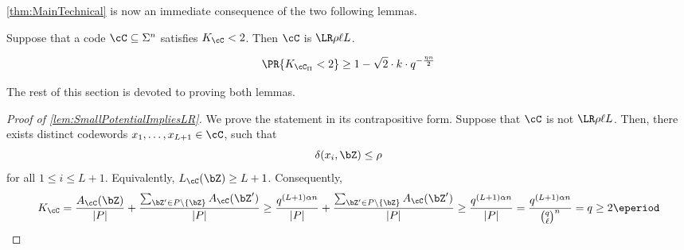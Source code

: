 \documentclass[11pt]{article}
\begin{document}
\cref{thm:MainTechnical} is now an immediate consequence of the two following lemmas.






\begin{lemma} \label{lem:SmallPotentialImpliesLR}
    Suppose that a code $\cC\subseteq \Sigma^n$ satisfies $K_\cC < 2$. Then $\cC$ is $\LR \rho \ell L$.
\end{lemma}

\begin{lemma} \label{lem:smallPotentialLikely}
    $$\PR{K_{\cC_\Pi} < 2} \ge 1-\sqrt2\cdot k \cdot q^{-\frac{\eta n} 2}$$
\end{lemma}

The rest of this section is devoted to proving both lemmas.






\begin{proof}[Proof of \cref{lem:SmallPotentialImpliesLR}]
    \sloppy
    We prove the statement in its contrapositive form. Suppose that $\cC$ is not $\LR\rho\ell L$. Then, there exists distinct codewords $x_1,\dots, x_{L+1}\in \cC$, such that $$\delta(x_i,\bZ)\le \rho$$ for all $1\le i\le L+1$. Equivalently, $L_\cC(\bZ) \ge L+1$. Consequently,
    $$
    K_\cC = \frac{A_\cC(\bZ)}{|P|} + \frac{\sum_{\bZ'\in P\setminus\{\bZ\}} A_{\cC}(\bZ')}{|P|} \ge \frac{q^{(L+1)\alpha n}}{|P|} + \frac{\sum_{\bZ'\in P\setminus\{\bZ\}} A_{\cC}(\bZ')}{|P|}\ge \frac{q^{(L+1)\alpha n}}{|P|} = \frac{q^{(L+1)\alpha n}}{\binom q\ell^n} = q \ge 2\eperiod$$
\end{proof}
\end{document}
